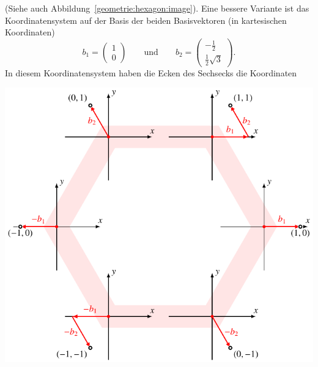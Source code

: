 (Siehe auch Abbildung~\ref{geometrie:hexagon:image}).
Eine bessere Variante ist das Koordinatensystem auf der Basis der beiden
Basisvektoren (in kartesischen Koordinaten)
\[
b_1 = \begin{pmatrix} 1\\0\end{pmatrix}
\qquad
\text{und}
\qquad
b_2 = \begin{pmatrix} -\frac12\\\frac12\sqrt{3}\end{pmatrix}.
\]
In diesem Koordinatensystem haben die Ecken des Sechsecks die Koordinaten
\begin{center}
\includegraphics{chapters/1-geometrie/images/hexagon2.pdf}
\end{center}
%
